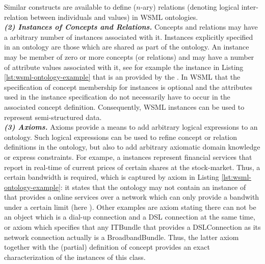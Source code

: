 Similar constructs are available to define ($n$-ary) relations (denoting
logical inter-relation between individuals and values) in WSML
ontologies.
\\ {\it \bfseries (2) Instances of Concepts and Relations.}
Concepts and relations may have a arbitrary number of
instances associated with it. Instances explicitly specified in an
ontology are those which are shared as part of the ontology. An
instance may be member of zero or more concepts (or relations) and may have a
number of attribute values associated with it, see for example the
instance  in Listing
\ref{lst:wsml-ontology-example} that is an  provided by the .
In WSML that the specification of
concept membership for instances is optional and the attributes
used in the instance specification do not necessarily have to
occur in the associated concept definition. Consequently, WSML
instances can be used to represent semi-structured data.
\\ {\it \bfseries (3) Axioms.} Axioms provide a means to add arbitrary
logical expressions to an ontology. Such logical expressions can
be used to refine concept or relation definitions in the ontology,
but also to add arbitrary axiomatic domain knowledge or express
constraints.
For exampe, a  instances represent financial services
that report in real-time of current prices of certain shares
at the stock-market. Thus, a certain bandwidth is required, which
is captured by axiom 
in Listing \ref{lst:wsml-ontology-example}: it states that the
ontology may not contain an instance of  that
provides a  online services over a network
which can only provide a bandwith under a certain limit (here
). Other examples are axiom 
stating there can not be an object which is a dial-up
connection and a DSL connection at the same time, or axiom
 which specifies that
any ITBundle that provides a DSLConnection as its
network connection actually is a BroadbandBundle. Thus, the latter
axiom together with the (partial) definition of concept
 provides an exact characterization of the
instances of this class.

